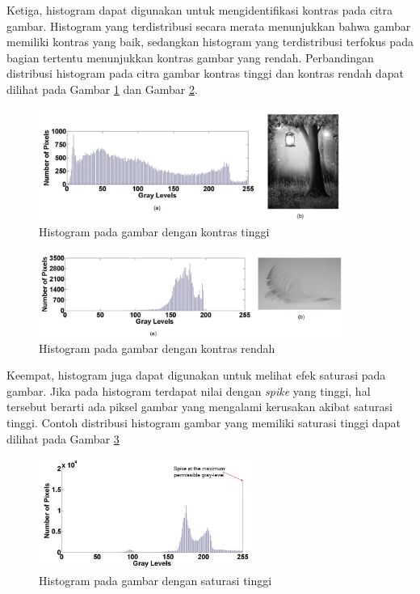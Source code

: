 \noindent Ketiga, histogram dapat digunakan untuk mengidentifikasi kontras pada citra gambar. Histogram yang terdistribusi secara merata menunjukkan bahwa gambar memiliki kontras yang baik, sedangkan histogram yang terdistribusi terfokus pada bagian tertentu menunjukkan kontras gambar yang rendah. Perbandingan distribusi histogram pada citra gambar kontras tinggi dan kontras rendah dapat dilihat pada Gambar \ref{Fig: 2-histogramkontrastinggi} dan Gambar \ref{Fig: 2-histogramkontrasrendah}.

\begin{figure}[!ht]
	\centering
	\includegraphics[width=10cm]{contents/chapter-2/2-histogramcontras.png}
	\caption[Histogram pada gambar dengan kontras tinggi]{Histogram pada gambar dengan kontras tinggi \cite{fiturhistogram}}
	\label{Fig: 2-histogramkontrastinggi}
\end{figure}

\begin{figure}[!ht]
	\centering
	\includegraphics[width=10cm]{contents/chapter-2/2-histogramnoncontras.png}
	\caption[Histogram pada gambar dengan kontras rendah]{Histogram pada gambar dengan kontras rendah \cite{fiturhistogram}}
	\label{Fig: 2-histogramkontrasrendah}
\end{figure}

\noindent Keempat, histogram juga dapat digunakan untuk melihat efek saturasi pada gambar. Jika pada histogram terdapat nilai dengan \emph{spike} yang tinggi, hal tersebut berarti ada piksel gambar yang mengalami kerusakan akibat saturasi tinggi. Contoh distribusi histogram gambar yang memiliki saturasi tinggi dapat dilihat pada Gambar \ref{Fig: 2-histogramsaturasitinggi}

\begin{figure}[!ht]
	\centering
	\includegraphics[width=7cm]{contents/chapter-2/2-histogramsaturasi.png}
	\caption[Histogram pada gambar dengan saturasi tinggi]{Histogram pada gambar dengan saturasi tinggi \cite{fiturhistogram}}
	\label{Fig: 2-histogramsaturasitinggi}
\end{figure}

